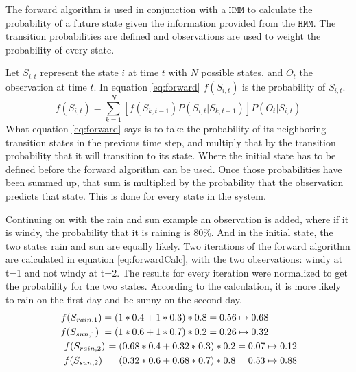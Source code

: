 \documentclass[12pt, a4paper]{article}
\newcommand{\HMM}[0]{%
  \mathtt{HMM}
}
\begin{document}
The forward algorithm is used in conjunction with a $\HMM$ to calculate the probability of a future state given the information provided from the $\HMM$. The transition probabilities are defined and observations are used to weight the probability of every state.  

Let $S_{i,t}$ represent the state $i$ at time $t$ with $N$ possible states, and $O_t$ the observation at time $t$. In equation \ref{eq:forward} $f(S_{i,t})$ is the probability of $S_{i,t}$\cite{MA-forw}.
\begin{equation}\label{eq:forward}
f(S_{i,t}) = \sum_{k=1}^{N} [f(S_{k,t-1})P(S_{i,t}|S_{k,t-1})]P(O_t|S_{i,t})
\end{equation}
What equation \ref{eq:forward} says is to take the probability of its neighboring transition states in the previous time step, and multiply that by the transition probability that it will transition to its state. Where the initial state has to be defined before the forward algorithm can be used. Once those probabilities have been summed up, that sum is multiplied by the probability that the observation predicts that state. This is done for every state in the system.

Continuing on with the rain and sun example an observation is added, where if it is windy, the probability that it is raining is 80\%. And in the initial state, the two states rain and sun are equally likely. Two iterations of the forward algorithm are calculated in equation \ref{eq:forwardCalc}, with the two observations: windy at t=1 and not windy at t=2. The results for every iteration were normalized to get the probability for the two states. According to the calculation, it is more likely to rain on the first day and be sunny on the second day.
\begin{equation}\label{eq:forwardCalc}
\begin{split}
f(S_{rain,1}) = (1*0.4+1*0.3)*0.8 = 0.56 \mapsto 0.68\hspace{29pt}
\\
f(S_{sun,1}) \hspace{3pt} = (1*0.6+1*0.7)*0.2 = 0.26 \mapsto 0.32\hspace{29pt}
\\
f(S_{rain,2}) \hspace{1pt} = (0.68*0.4+0.32*0.3)*0.2 = 0.07 \mapsto 0.12 \hspace{-1pt}
\\
f(S_{sun,2}) \hspace{4pt} = (0.32*0.6+0.68*0.7)*0.8 = 0.53 \mapsto 0.88\hspace{-1pt}
\end{split}
\end{equation}
\end{document}
